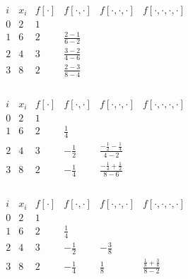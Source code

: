 \documentclass{report}
\begin{document}
\begin{itemize}
\begin{align*}
\end{align*}
\bigbreak \noindent 
\begin{align*}
    \begin{array}{c|c|cccc}
        i & x_i & f[\cdot] & f[\cdot,\cdot] & f[\cdot,\cdot,\cdot] & f[\cdot,\cdot,\cdot,\cdot] \\
        \hline
        0 & 2 & 1 &  &  \\
        1 & 6 & 2 & \frac{2-1}{6-2} &  \\
        2 & 4 & 3 & \frac{3-2}{4-6} &  & \\
        3 & 8 & 2 & \frac{2-3}{8-4} &  &  \\
    \end{array}
\end{align*}

\begin{align*}
    \begin{array}{c|c|cccc}
        i & x_i & f[\cdot] & f[\cdot,\cdot] & f[\cdot,\cdot,\cdot] & f[\cdot,\cdot,\cdot,\cdot] \\
        \hline
        0 & 2 & 1 &  &  \\
        1 & 6 & 2 & \frac{1}{4} &  \\
        2 & 4 & 3 & -\frac{1}{2} & \frac{-\frac{1}{2} - \frac{1}{4}}{4-2} & \\
        3 & 8 & 2 & -\frac{1}{4} & \frac{-\frac{1}{4} + \frac{1}{2}}{8-6} &  \\
    \end{array}
\end{align*}

\begin{align*}
    \begin{array}{c|c|cccc}
        i & x_i & f[\cdot] & f[\cdot,\cdot] & f[\cdot,\cdot,\cdot] & f[\cdot,\cdot,\cdot,\cdot] \\
        \hline
        0 & 2 & 1 &  &  \\
        1 & 6 & 2 & \frac{1}{4} &  \\
        2 & 4 & 3 & -\frac{1}{2} & -\frac38 & \\
        3 & 8 & 2 & -\frac{1}{4} & \frac18 & \frac{\frac18 + \frac38}{8-2} \\
    \end{array}
\end{align*}


\end{itemize}
\end{document}
